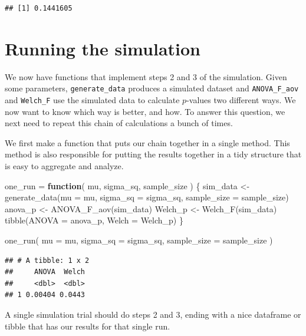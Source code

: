 \documentclass[
]{book}
\newenvironment{Shaded}{\begin{snugshade}}{\end{snugshade}}
\newcommand{\AttributeTok}[1]{\textcolor[rgb]{0.77,0.63,0.00}{#1}}
\newcommand{\ControlFlowTok}[1]{\textcolor[rgb]{0.13,0.29,0.53}{\textbf{#1}}}
\newcommand{\FunctionTok}[1]{\textcolor[rgb]{0.00,0.00,0.00}{#1}}
\newcommand{\NormalTok}[1]{#1}
\newcommand{\OtherTok}[1]{\textcolor[rgb]{0.56,0.35,0.01}{#1}}
\begin{document}
\begin{verbatim}
## [1] 0.1441605
\end{verbatim}

\hypertarget{running-the-simulation}{%
\section{Running the simulation}\label{running-the-simulation}}

We now have functions that implement steps 2 and 3 of the simulation.
Given some parameters, \texttt{generate\_data} produces a simulated dataset and \texttt{ANOVA\_F\_aov} and \texttt{Welch\_F} use the simulated data to calculate \(p\)-values two different ways.
We now want to know which way is better, and how.
To answer this question, we next need to repeat this chain of calculations a bunch of times.

We first make a function that puts our chain together in a single method.
This method is also responsible for putting the results together in a tidy structure that is easy to aggregate and analyze.

\begin{Shaded}
\begin{Highlighting}[]
\NormalTok{one\_run }\OtherTok{=} \ControlFlowTok{function}\NormalTok{( mu, sigma\_sq, sample\_size ) \{}
\NormalTok{  sim\_data }\OtherTok{\textless{}{-}} \FunctionTok{generate\_data}\NormalTok{(}\AttributeTok{mu =}\NormalTok{ mu, }\AttributeTok{sigma\_sq =}\NormalTok{ sigma\_sq,}
                            \AttributeTok{sample\_size =}\NormalTok{ sample\_size)}
\NormalTok{  anova\_p }\OtherTok{\textless{}{-}} \FunctionTok{ANOVA\_F\_aov}\NormalTok{(sim\_data)}
\NormalTok{  Welch\_p }\OtherTok{\textless{}{-}} \FunctionTok{Welch\_F}\NormalTok{(sim\_data)}
  \FunctionTok{tibble}\NormalTok{(}\AttributeTok{ANOVA =}\NormalTok{ anova\_p, }\AttributeTok{Welch =}\NormalTok{ Welch\_p)}
\NormalTok{\}}

\FunctionTok{one\_run}\NormalTok{( }\AttributeTok{mu =}\NormalTok{ mu, }\AttributeTok{sigma\_sq =}\NormalTok{ sigma\_sq, }\AttributeTok{sample\_size =}\NormalTok{ sample\_size )}
\end{Highlighting}
\end{Shaded}

\begin{verbatim}
## # A tibble: 1 x 2
##     ANOVA  Welch
##     <dbl>  <dbl>
## 1 0.00404 0.0443
\end{verbatim}

A single simulation trial should do steps 2 and 3, ending with a nice dataframe or tibble that has our results for that single run.
\end{document}
